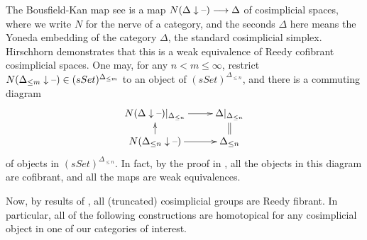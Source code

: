\documentclass[10pt]{article}
\renewcommand{\Set}{Set}
\newcommand{\TruncSimplex}[1]{{\Delta_{\leq#1}}}
\begin{document}
\begin{convergence}
The Bousfield-Kan map see \cite{Hirschhorn.pdf} is a map $N(\Delta\downarrow\textup{--})\longrightarrow \Delta$ of cosimplicial spaces, where we write $N$ for the nerve of a category, and the seconds $\Delta$ here means the Yoneda embedding of the category $\Delta$, the standard cosimplicial simplex. Hirschhorn demonstrates that this is a weak equivalence of Reedy cofibrant cosimplicial spaces. One may, for any $n< m\leq\infty$, restrict $N(\TruncSimplex{m}\downarrow\DASH)\in(s\Set)^{\TruncSimplex{m}}$ to an object of $(s\Set)^\TruncSimplex{n}$, and there is a commuting diagram
\[\xymatrix@R=4mm{
N(\Delta\downarrow\DASH)|_{\TruncSimplex{n}}
\ar[r]
&%
\Delta|_{\TruncSimplex{n}}
\ar@{=}[d]\\%
N(\TruncSimplex{n}\downarrow\DASH)\ar[u]
\ar[r]
&%
\TruncSimplex{n}%
}\]
of objects in $(s\Set)^{\TruncSimplex{n}}$. In fact, by the proof in \cite{Hirschhorn.pdf}, all the objects in this diagram are cofibrant, and all the maps are weak equivalences.

Now, by results of \cite[X,4.9]{YellowMonster}, all (truncated) cosimplicial groups are Reedy fibrant. In particular, all of the following constructions are homotopical for any cosimplicial object in one of our categories of interest.


\end{convergence}
\end{document}
